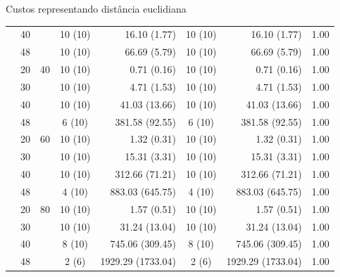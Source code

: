\documentclass[dvipsnames]{beamer}
\begin{document}
\begin{frame}{Custos representando distância euclidiana}
{\begin{table}
\begin{tabular}{|c|c|c|>{\columncolor[rgb]{1,1,0}}c|r|>{\columncolor[rgb]{1,1,0}}c|r|c|}
 & 40 & & 10 (10) & 16.10 (1.77) & 10 (10) & 16.10 (1.77) & 1.00 \\
 & 48 & & 10 (10) & 66.69 (5.79) & 10 (10) & 66.69 (5.79) & 1.00 \\
 & 20 & 40 & 10 (10) & 0.71 (0.16) & 10 (10) & 0.71 (0.16) & 1.00 \\
 & 30 & & 10 (10) & 4.71 (1.53) & 10 (10) & 4.71 (1.53) & 1.00 \\
 & 40 & & 10 (10) & 41.03 (13.66) & 10 (10) & 41.03 (13.66) & 1.00 \\
 & 48 & & 6 (10) & 381.58 (92.55) & 6 (10) & 381.58 (92.55) & 1.00 \\
 & 20 & 60 & 10 (10) & 1.32 (0.31) & 10 (10) & 1.32 (0.31) & 1.00 \\
 & 30 & & 10 (10) & 15.31 (3.31) & 10 (10) & 15.31 (3.31) & 1.00 \\
 & 40 & & 10 (10) & 312.66 (71.21) & 10 (10) & 312.66 (71.21) & 1.00 \\
 & 48 & & 4 (10) & 883.03 (645.75) & 4 (10) & 883.03 (645.75) & 1.00 \\
 & 20 & 80 & 10 (10) & 1.57 (0.51) & 10 (10) & 1.57 (0.51) & 1.00 \\
 & 30 & & 10 (10) & 31.24 (13.04) & 10 (10) & 31.24 (13.04) & 1.00 \\
 & 40 & & 8 (10) & 745.06 (309.45) & 8 (10) & 745.06 (309.45) & 1.00 \\
\rowcolor[rgb]{1,1,0} & 48 & & 2 (6) & 1929.29 (1733.04) & 2 (6) & 1929.29 (1733.04) & 1.00 \\

\hline\hline
\end{tabular}
\end{table}
}
  
\end{frame}
\end{document}
